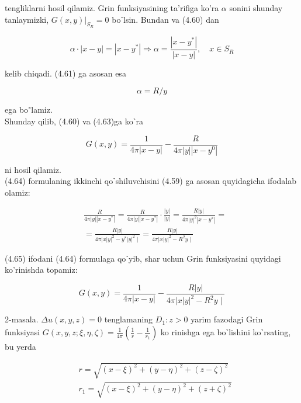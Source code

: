 \documentclass[10pt]{article}
\begin{document}
tengliklarni hosil qilamiz. Grin funksiyasining ta’rifiga ko’ra $\alpha$ sonini shunday tanlaymizki, $\left.G(x, y)\right|_{S_{R}}=0$ boˋlsin. Bundan va (4.60) dan


\begin{equation*}
\alpha \cdot|x-y|=\left|x-y^{*}\right| \Rightarrow \alpha=\frac{\left|x-y^{*}\right|}{|x-y|}, \quad x \in S_{R} \tag{4.62}
\end{equation*}


kelib chiqadi. (4.61) ga asosan esa


\begin{equation*}
\alpha=R / y \tag{4.63}
\end{equation*}


ega bo"lamiz.\\
Shunday qilib, (4.60) va (4.63)ga koˋra


\begin{equation*}
G(x, y)=\frac{1}{4 \pi|x-y|}-\frac{R}{4 \pi|y|\left|x-y^{0}\right|} \tag{4.64}
\end{equation*}


ni hosil qilamiz.\\
(4.64) formulaning ikkinchi qoˋshiluvchisini (4.59) ga asosan quyidagicha ifodalab olamiz:


\begin{align*}
& \frac{R}{4 \pi|y|\left|x-y^{*}\right|}=\frac{R}{4 \pi|y|\left|x-y^{*}\right|} \cdot \frac{|y|}{|y|}=\frac{R|y|}{4 \pi|y|^{2}\left|x-y^{*}\right|}= \\
& =\frac{R|y|}{\left.4 \pi|x| y\right|^{2}-y^{*}|y|^{2} \mid}=\frac{R|y|}{\left.4 \pi|x| y\right|^{2}-R^{2} y \mid} \tag{4.65}
\end{align*}


(4.65) ifodani (4.64) formulaga qoˋyib, shar uchun Grin funksiyasini quyidagi ko'rinishda topamiz:


\begin{equation*}
G(x, y)=\frac{1}{4 \pi|x-y|}-\frac{R|y|}{\left.4 \pi|x| y\right|^{2}-R^{2} y \mid} \tag{4,66}
\end{equation*}


2-masala. $\Delta u(x, y, z)=0$ tenglamaning $D_{1}: z>0$ yarim fazodagi Grin funksiyasi $G(x, y, z ; \xi, \eta, \zeta)=\frac{1}{4 \pi}\left(\frac{1}{r}-\frac{1}{r_{1}}\right)$ ko rinishga ega boˋlishini koˋrsating, bu yerda


\begin{align*}
& r=\sqrt{(x-\xi)^{2}+(y-\eta)^{2}+(z-\zeta)^{2}} \\
& r_{1}=\sqrt{(x-\xi)^{2}+(y-\eta)^{2}+(z+\zeta)^{2}} \tag{4.2-chizma}
\end{align*}
\end{document}
